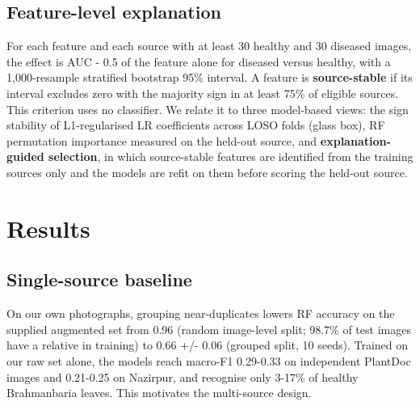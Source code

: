 \documentclass[conference]{IEEEtran}
\begin{document}
\subsection{Feature-level explanation}
For each feature and each source with at least 30 healthy and 30 diseased images, the effect is AUC - 0.5 of the feature alone for diseased versus healthy, with a 1,000-resample stratified bootstrap 95\% interval. A feature is \textbf{source-stable} if its interval excludes zero with the majority sign in at least 75\% of eligible sources. This criterion uses no classifier. We relate it to three model-based views: the sign stability of L1-regularised LR coefficients across LOSO folds (glass box), RF permutation importance measured on the held-out source, and \textbf{explanation-guided selection}, in which source-stable features are identified from the training sources only and the models are refit on them before scoring the held-out source.

\section{Results}
\subsection{Single-source baseline}
On our own photographs, grouping near-duplicates lowers RF accuracy on the supplied augmented set from 0.96 (random image-level split; 98.7\% of test images have a relative in training) to 0.66 +/- 0.06 (grouped split, 10 seeds). Trained on our raw set alone, the models reach macro-F1 0.29-0.33 on independent PlantDoc images and 0.21-0.25 on Nazirpur, and recognise only 3-17\% of healthy Brahmanbaria leaves. This motivates the multi-source design.
\end{document}
